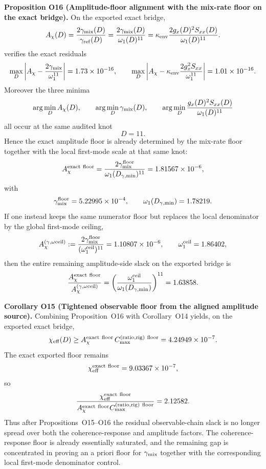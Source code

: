 \documentclass[aps,prd,onecolumn,notitlepage,nofootinbib,superscriptaddress,11pt,floatfix]{revtex4-2}
\begin{document}
\medskip\noindent\textbf{Proposition O16 (Amplitude-floor alignment with the mix-rate floor on the exact bridge).}
On the exported exact bridge,
\[
A_\chi(D)=\frac{2\gamma_{\rm mix}(D)}{\gamma_{\rm ref}(D)}
=
\frac{2\gamma_{\rm mix}(D)}{\omega_1(D)^{11}}
=
\kappa_{\rm env}\frac{2g_x(D)^2S_{xx}(D)}{\omega_1(D)^{11}}.
\]
 verifies the exact residuals
\[
\max_D \left|A_\chi-\frac{2\gamma_{\rm mix}}{\omega_1^{11}}\right|
=1.73\times10^{-16},
\qquad
\max_D \left|A_\chi-\kappa_{\rm env}\frac{2g_x^2S_{xx}}{\omega_1^{11}}\right|
=1.01\times10^{-16}.
\]
Moreover the three minima
\[
\arg\min_D A_\chi(D),
\qquad
\arg\min_D \gamma_{\rm mix}(D),
\qquad
\arg\min_D \frac{g_x(D)^2S_{xx}(D)}{\omega_1(D)^{11}}
\]
all occur at the same audited knot
\[
D=11.
\]
Hence the exact amplitude floor is already determined by the mix-rate floor together with the local first-mode scale at that same knot:
\[
A_\chi^{\rm exact\ floor}
=
\frac{2\gamma_{\rm mix}^{\rm floor}}{\omega_1(D_{\gamma,\min})^{11}}
=1.81567\times10^{-6},
\]
with
\[
\gamma_{\rm mix}^{\rm floor}=5.22995\times10^{-4},
\qquad
\omega_1(D_{\gamma,\min})=1.78219.
\]
If one instead keeps the same numerator floor but replaces the local denominator by the global first-mode ceiling,
\[
A_\chi^{(\gamma,\omega{\rm ceil})}
:=
\frac{2\gamma_{\rm mix}^{\rm floor}}{(\omega_1^{\rm ceil})^{11}}
=1.10807\times10^{-6},
\qquad
\omega_1^{\rm ceil}=1.86402,
\]
then the entire remaining amplitude-side slack on the exported bridge is
\[
\frac{A_\chi^{\rm exact\ floor}}{A_\chi^{(\gamma,\omega{\rm ceil})}}
=
\left(\frac{\omega_1^{\rm ceil}}{\omega_1(D_{\gamma,\min})}\right)^{11}
=1.63858.
\]

\medskip\noindent\textbf{Corollary O15 (Tightened observable floor from the aligned amplitude source).}
Combining Proposition~O16 with Corollary~O14 yields, on the exported exact bridge,
\[
\chi_{\rm eff}(D)\ge
A_\chi^{\rm exact\ floor}\,C_{\max}^{\rm(ratio,rig)\ floor}
=4.24949\times10^{-7}.
\]
The exact exported floor remains
\[
\chi_{\rm eff}^{\rm exact\ floor}=9.03367\times10^{-7},
\]
so
\[
\frac{\chi_{\rm eff}^{\rm exact\ floor}}
{A_\chi^{\rm exact\ floor}C_{\max}^{\rm(ratio,rig)\ floor}}
=2.12582.
\]
Thus after Propositions~O15--O16 the residual observable-chain slack is no longer spread over both the coherence-response and amplitude factors.  The coherence-response floor is already essentially saturated, and the remaining gap is concentrated in proving an a priori floor for $\gamma_{\rm mix}$ together with the corresponding local first-mode denominator control.
\end{document}
